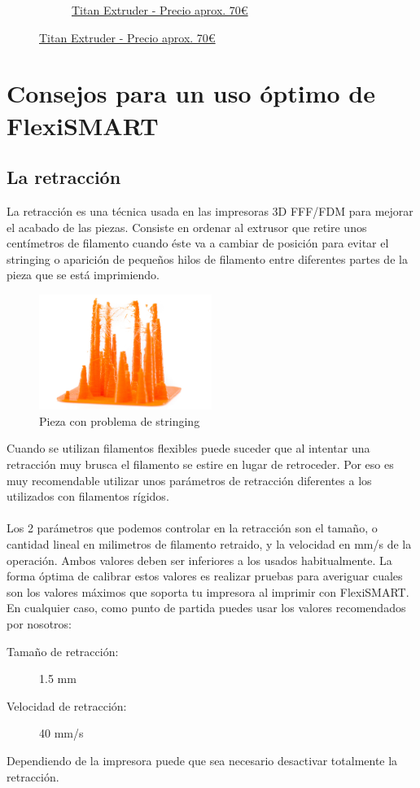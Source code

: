 \documentclass[11pt,a4paper]{article}
\begin{document}
\begin{figure}[H]
\begin{subfigure}[b]{0.4\textwidth}
		\caption*{\href{www.e3d-online.com}{{\footnotesize Titan Extruder - Precio aprox. 70\euro}}}
    \end{subfigure}
\end{figure}
\section{Consejos para un uso óptimo de FlexiSMART}
	\subsection{La retracción}
La retracción es una técnica usada en las impresoras 3D FFF/FDM para mejorar el acabado de las piezas. Consiste en ordenar al extrusor que retire unos centímetros de filamento cuando éste va a cambiar de posición para evitar el stringing o aparición de pequeños hilos de filamento entre diferentes partes de la pieza que se está imprimiendo.
\begin{figure}[H]
\centering
\includegraphics[width=0.5\textwidth,cfbox=azul_marcos 4pt 0pt]{FOTOS/RETRACCION1}
\caption*{Pieza con problema de stringing}
\end{figure}
Cuando se utilizan filamentos flexibles puede suceder que al intentar una retracción muy brusca el filamento se estire en lugar de retroceder. Por eso es muy recomendable utilizar unos parámetros de retracción diferentes a los utilizados con filamentos rígidos.
\\\\
Los 2 parámetros que podemos controlar en la retracción son el tamaño, o cantidad lineal en milimetros de filamento retraido, y la velocidad en mm/s de la operación. Ambos valores deben ser inferiores a los usados habitualmente. La forma óptima de calibrar estos valores es realizar pruebas para averiguar cuales son los valores máximos que soporta tu impresora al imprimir con FlexiSMART. En cualquier caso, como punto de partida puedes usar los valores recomendados por nosotros:
\begin{description}
\item [Tamaño de retracción:] 1.5 mm
\item [Velocidad de retracción:] 40 mm/s
\end{description}
Dependiendo de la impresora puede que sea necesario desactivar totalmente la retracción.
\end{document}
